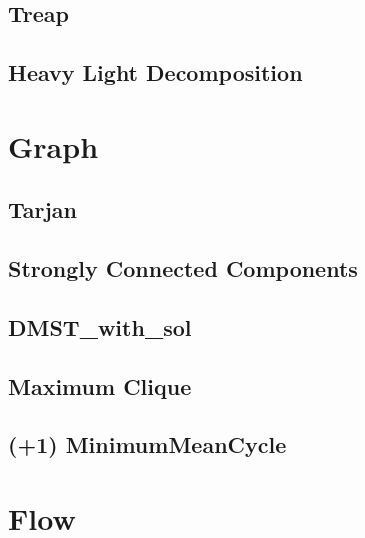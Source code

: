 \documentclass[10pt,twocolumn,oneside]{article}
\begin{document}
\subsection{Treap}


\subsection {Heavy Light Decomposition}


\section{Graph}

\subsection{Tarjan}


\subsection{Strongly Connected Components}


%

\newpage

\subsection{DMST\_with\_sol}


\subsection{Maximum Clique}


\subsection{(+1) MinimumMeanCycle}


\section{Flow}
\end{document}
